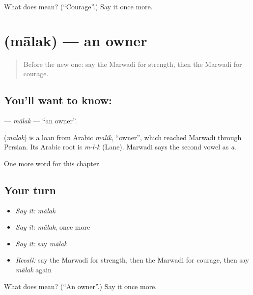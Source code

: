 \begin{tcolorbox}[breakable,colback=teal!4,colframe=teal!35!black,title={Before you move on}]
What does  mean? (\textquotedblleft{}Courage\textquotedblright{}.) Say it once more.
\end{tcolorbox}
\section[\texorpdfstring{\mw{मालक} (mālak)}{मालक (mālak)}]{ (mālak) — an owner}

\label{lesson:MW-C114-malak}



\begin{quote}
Before the new one: say the Marwadi for strength, then the Marwadi for courage.
\end{quote}

\subsection*{You'll want to know: }
\textbf{} — \emph{mālak} — \textquotedblleft{}an owner\textquotedblright{}.

\begin{cousinweb}
\textbf{} (\emph{mālak}) is a loan from Arabic \emph{mālik}, \textquotedblleft{}owner\textquotedblright{}, which reached Marwadi through Persian. Its Arabic root is \emph{m-l-k} (Lane). Marwadi says the second vowel as \emph{a}.
\end{cousinweb}

\begin{grammarlens}[title={What you've built}]
One more word for this chapter.
\end{grammarlens}

\subsection*{Your turn}
\begin{itemize}
\raggedright
  \item \emph{Say it:} \emph{mālak}
  \item \emph{Say it:} \emph{mālak}, once more
  \item \emph{Say it:} say \emph{mālak}
  \item \emph{Recall:} say the Marwadi for strength, then the Marwadi for courage, then say \emph{mālak} again
\end{itemize}

\begin{tcolorbox}[breakable,colback=teal!4,colframe=teal!35!black,title={Before you move on}]
What does  mean? (\textquotedblleft{}An owner\textquotedblright{}.) Say it once more.
\end{tcolorbox}
